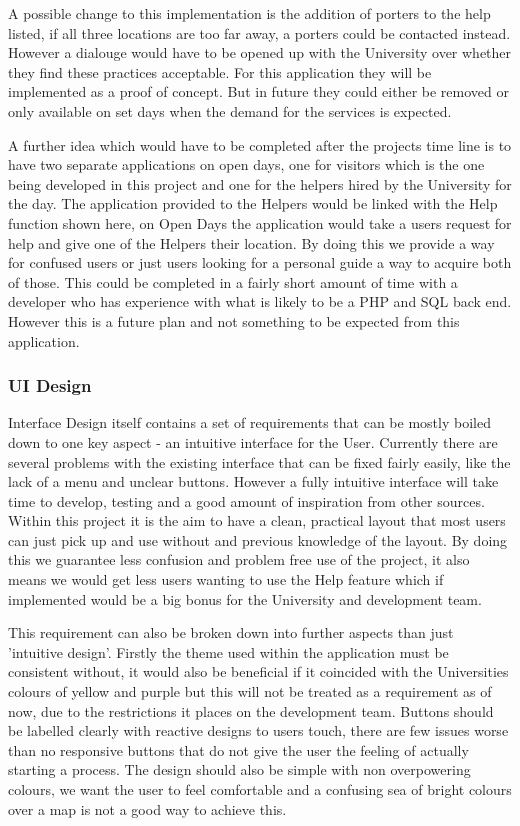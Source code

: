 A possible change to this implementation is the addition of porters to the help listed, if all three locations are too far away, a porters could be contacted instead. However a dialouge would have to be opened up with the University over whether they find these practices acceptable. For this application they will be implemented as a proof of concept. But in future they could either be removed or only available on set days when the demand for the services is expected.

A further idea which would have to be completed after the projects time line is to have two separate applications on open days, one for visitors which is the one being developed in this project and one for the helpers hired by the University for the day. The application provided to the Helpers would be linked with the Help function shown here, on Open Days the application would take a users request for help and give one of the Helpers their location. By doing this we provide a way for confused users or just users looking for a personal guide a way to acquire both of those. This could be completed in a fairly short amount of time with a developer who has experience with what is likely to be a PHP and SQL back end. However this is a future plan and not something to be expected from this application.  
\subsubsection{UI Design}
Interface Design itself contains a set of requirements that can be mostly boiled down to one key aspect - an intuitive interface for the User. Currently there are several problems with the existing interface that can be fixed fairly easily, like the lack of a menu and unclear buttons. However a fully intuitive interface will take time to develop, testing and a good amount of inspiration from other sources. Within this project it is the aim to have a clean, practical layout that most users can just pick up and use without and previous knowledge of the layout. By doing this we guarantee less confusion and problem free use of the project, it also means we would get less users wanting to use the Help feature which if implemented would be a big bonus for the University and development team. 

This requirement can also be broken down into further aspects than just 'intuitive design'. Firstly the theme used within the application must be consistent without, it would also be beneficial if it coincided with the Universities colours of yellow and purple but this will not be treated as a requirement as of now, due to the restrictions it places on the development team. Buttons should be labelled clearly with reactive designs to users touch, there are few issues worse than no responsive buttons that do not give the user the feeling of actually starting a process. The design should also be simple with non overpowering colours, we want the user to feel comfortable and a confusing sea of bright colours over a map is not a good way to achieve this.


